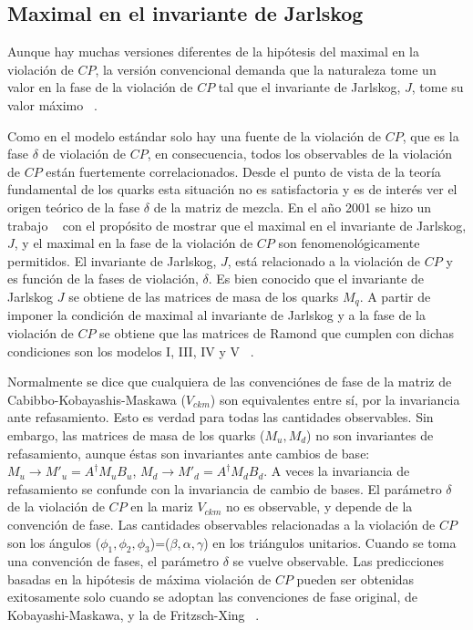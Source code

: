 \subsection{Maximal en el invariante de Jarlskog}
Aunque hay muchas versiones diferentes de la hip\'otesis del maximal en la 
violaci\'on de $CP$, la versi\'on convencional demanda que la naturaleza tome un
valor en la fase de la violaci\'on de $CP$ tal que el invariante de Jarlskog,
$J$, tome su valor m\'aximo ~\cite{Koi200401}.

Como en el modelo est\'andar solo hay una fuente de la violaci\'on de $CP$, que
es la fase $\delta$ de violaci\'on de $CP$, en consecuencia, todos los 
observables de la violaci\'on de $CP$ est\'an fuertemente correlacionados. Desde
el punto de vista de la teor\'ia fundamental de los quarks esta situaci\'on no
es satisfactoria y es de inter\'es ver el origen te\'orico de la fase $\delta$ 
de la matriz de mezcla. En el a\~no 2001 se hizo un trabajo ~\cite{Rod200101} 
con el prop\'osito de mostrar que el maximal en el invariante de Jarlskog, $J$, 
y el maximal en la fase de la violaci\'on de $CP$ son fenomenol\'ogicamente 
permitidos. El invariante de Jarlskog, $J$, est\'a relacionado a la violaci\'on 
de $CP$ y es funci\'on de la fases de violaci\'on, $\delta$. Es bien conocido 
que el invariante de Jarlskog $J$ se obtiene de las matrices de masa de los 
quarks $M_q$. A partir de imponer la condici\'on de maximal al invariante de 
Jarlskog y a la fase de la violaci\'on de $CP$ se obtiene que las matrices de 
Ramond que cumplen con dichas condiciones son los modelos I, III, IV y V 
~\cite{Rod200101}.


Normalmente se dice que cualquiera de las convenci\'ones de fase de la matriz de
Cabibbo-Kobayashis-Maskawa ($V_{ckm}$) son equivalentes entre s\'i, por la 
invariancia ante refasamiento. Esto es verdad para todas las cantidades 
observables. Sin embargo, las matrices de masa de los quarks ($M_u,M_d$) no son
invariantes de refasamiento, aunque \'estas son invariantes ante cambios de 
base: $M_u\rightarrow M'_u=A^{\dag}M_uB_u$, 
$M_d\rightarrow M'_d=A^{\dag}M_dB_d$. A veces la invariancia de refasamiento se
confunde con la invariancia de cambio de bases. El par\'ametro $\delta$ de la
violaci\'on de $CP$ en la mariz $V_{ckm}$ no es observable, y depende de la
convenci\'on de fase. Las cantidades observables relacionadas a la violaci\'on
de $CP$ son los \'angulos ($\phi_1, \phi_2,\phi_3$)=($\beta,\alpha,\gamma$) en los tri\'angulos unitarios. Cuando se
toma una convenci\'on de fases, el par\'ametro $\delta$ se vuelve observable.
Las predicciones  basadas en la hip\'otesis de m\'axima violaci\'on de $CP$ 
pueden ser obtenidas exitosamente solo cuando se adoptan las convenciones de 
fase original, de Kobayashi-Maskawa, y la de Fritzsch-Xing ~\cite{Koi200601}.


